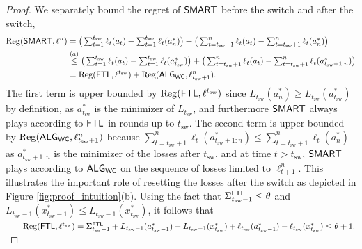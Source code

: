 \begin{proof}
We separately bound the regret of $\mathsf{SMART}$ before the switch and after the switch,
\begin{align*}
\mathrm{Reg}(\mathsf{SMART}, \ell^n)
&=  \big(\textstyle\sum_{t=1}^{t_{\mathrm{sw}}} \ell_t(a_t) - \textstyle\sum_{t=1}^{t_{\mathrm{sw}}} \ell_t(a^*_n)\big) + \big(\textstyle\sum_{t=t_{\mathrm{sw}}+1}^n \ell_t(a_t) - \textstyle\sum_{t=t_{\mathrm{sw}}+1}^n \ell_t(a^*_n)\big) \\
&\stackrel{(a)}{\le} \big(\textstyle\sum_{t=1}^{t_{\mathrm{sw}}} \ell_t(a_t) - \textstyle\sum_{t=1}^{t_{\mathrm{sw}}} \ell_t(a^*_{t_{\mathrm{sw}}})\big) + \big(\textstyle\sum_{t=t_{\mathrm{sw}}+1}^n \ell_t(a_t) - \textstyle\sum_{t=t_{\mathrm{sw}}+1}^n \ell_t(a^*_{t_{\mathrm{sw}}+1:n})\big) \\
&= \mathrm{Reg}(\mathsf{FTL}, \ell^{t_{\mathrm{sw}}}) + \mathrm{Reg}(\mathsf{ALG}_{\mathsf{WC}}, \ell_{t_{\mathrm{sw}}+1}^n).
\end{align*}
The first term is upper bounded by $\mathrm{Reg}(\mathsf{FTL}, \ell^{t_{\mathrm{sw}}})$ since $L_{t_{\mathrm{sw}}}(a^*_n) \ge L_{t_{\mathrm{sw}}}(a^*_{t_{\mathrm{sw}}})$ by definition, as $a^*_{t_{\mathrm{sw}}}$ is the minimizer of $L_{t_{\mathrm{sw}}}$, and furthermore $\mathsf{SMART}$ always plays according to $\mathsf{FTL}$ in rounds up to $t_{\mathrm{sw}}$. The second term is upper bounded by $\mathrm{Reg}(\mathsf{ALG}_{\mathsf{WC}}, \ell_{t_{\mathrm{sw}}+1}^n)$ because $\sum_{t=t_{\mathrm{sw}}+1}^n \ell_t(a^*_{t_{\mathrm{sw}}+1:n}) \leq \sum_{t=t_{\mathrm{sw}}+1}^n \ell_t(a^*_n)$ as $a^*_{t_{\mathrm{sw}}+1:n}$ is the minimizer of the losses after $t_{\mathrm{sw}}$, and at time $t > t_{\mathrm{sw}}$, $\mathsf{SMART}$ plays according to $\mathsf{ALG}_{\mathsf{WC}}$ on the sequence of losses limited to $\ell_{t+1}^n$. This illustrates the important role of resetting the losses after the switch as depicted in Figure \ref{fig:proof_intuition}(b).
Using the fact that $\Sigma^{\mathsf{FTL}}_{t_{\mathrm{sw}}-1} \le \theta$ and $L_{t_{\mathrm{sw}}-1}(x^*_{t_{\mathrm{sw}}-1}) \le L_{t_{\mathrm{sw}}-1}(x^*_{t_{\mathrm{sw}}})$, it follows that \\
$~~~~~~\mathrm{Reg}(\mathsf{FTL}, \ell^{t_{\mathrm{sw}}}) = \Sigma^{\mathsf{FTL}}_{t_{\mathrm{sw}}-1} + L_{t_{\mathrm{sw}}-1}(a^*_{t_{\mathrm{sw}}-1}) - L_{t_{\mathrm{sw}}-1}(x^*_{t_{\mathrm{sw}}}) + \ell_{t_{\mathrm{sw}}}(a^*_{t_{\mathrm{sw}}-1}) - \ell_{t_{\mathrm{sw}}}(x^*_{t_{\mathrm{sw}}}) \leq \theta + 1.$
\end{proof}


